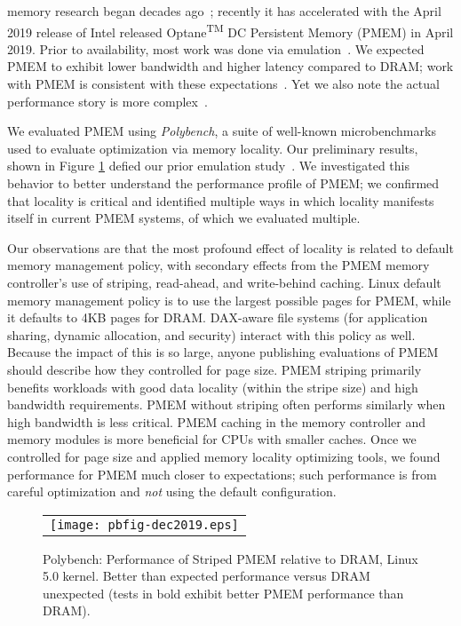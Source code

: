  memory research began decades ago~\cite{wu1994envy}; recently it has accelerated with the April 2019 release of Intel released Optane\textsuperscript{\tiny TM} DC Persistent Memory (PMEM) in April 2019. Prior to availability, most work was done via emulation~\cite{wu1994envy,Maciejewski2017persistent,dulloor2014system,volos2015quartz,doudali2017comerge}.  We expected PMEM to exhibit lower bandwidth and higher latency compared to DRAM; work with PMEM is consistent with these expectations~\cite{gill2019single,izraelevitz2019basic}.  Yet we also note the actual performance story is more complex~\cite{peng2019system}. 

We evaluated PMEM using \textit{Polybench}, a suite of well-known microbenchmarks used to evaluate optimization via memory locality.  Our preliminary results, shown in Figure \ref{fig:polybench} defied our prior emulation study~\cite{doudali2017comerge}.  We investigated this behavior to better understand the performance profile of PMEM; we confirmed that locality is critical and identified multiple ways in which locality manifests itself in current PMEM systems, of which we evaluated multiple.

Our observations are that the most profound effect of locality is related to default memory management policy, with secondary effects from the PMEM memory controller's use of striping, read-ahead, and write-behind caching.  Linux default memory management policy is to use the largest possible pages for PMEM, while it defaults to 4KB pages for DRAM.  DAX-aware file systems (for application sharing, dynamic allocation, and security) interact with this policy as well.  Because the impact of this is so large, anyone publishing evaluations of PMEM should describe how they controlled for page size. PMEM striping primarily benefits workloads with good data locality (within the stripe size) and high bandwidth requirements.  PMEM without striping often performs similarly when high bandwidth is less critical.  PMEM caching in the memory controller and memory modules is more beneficial for CPUs with smaller caches.  Once we controlled for page size and applied memory locality optimizing tools, we found performance for PMEM much closer to expectations; such performance is from careful optimization and \textit{not} using the default configuration.

\begin{figure}[!hb]
    \captionsetup{justification=centering}
    \centering
    \caption{Polybench: Performance of Striped PMEM relative to DRAM, Linux 5.0 kernel.  Better than expected performance versus DRAM unexpected (tests in bold exhibit better PMEM performance than DRAM).}
    \vspace{0.1cm}
    \label{fig:polybench}
    \begin{tabular}{c}
        \texttt{[image: pbfig-dec2019.eps]}
    \end{tabular}
\end{figure}

 

